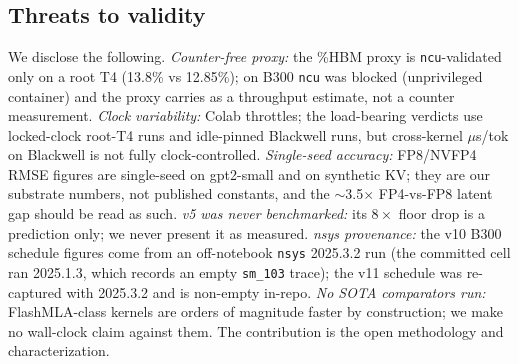 \subsection{Threats to validity}
\label{sec:threats}
We disclose the following.
\emph{Counter-free proxy:} the \%HBM proxy is \texttt{ncu}-validated only on a
root T4 (13.8\% vs 12.85\%); on B300 \texttt{ncu} was blocked
(unprivileged container) and the proxy carries as a throughput estimate, not a
counter measurement.
\emph{Clock variability:} Colab throttles; the load-bearing verdicts use
locked-clock root-T4 runs and idle-pinned Blackwell runs, but cross-kernel
$\mu$s/tok on Blackwell is not fully clock-controlled.
\emph{Single-seed accuracy:} FP8/NVFP4 RMSE figures are single-seed on
gpt2-small and on synthetic KV; they are our substrate numbers, not published
constants, and the $\sim$3.5$\times$ FP4-vs-FP8 latent gap should be read as such.
\emph{v5 was never benchmarked:} its $8\times$ floor drop is a prediction only;
we never present it as measured.
\emph{nsys provenance:} the v10 B300 schedule figures come from an off-notebook
\texttt{nsys} 2025.3.2 run (the committed cell ran 2025.1.3, which records an
empty \texttt{sm\_103} trace); the v11 schedule was re-captured with 2025.3.2 and
is non-empty in-repo.
\emph{No SOTA comparators run:} FlashMLA-class kernels are orders of magnitude
faster by construction; we make no wall-clock claim against them. The
contribution is the open methodology and characterization.
